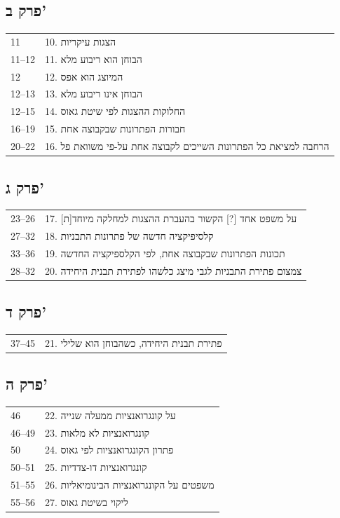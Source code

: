 \subsection*{פרק ב'}
\begin{tabular}{ll}
11 & 10. הצגות עיקריות \\
11--12 & 11. הבוחן הוא ריבוע מלא \\
12 & 12. המיוצג הוא אפס \\
12--13 & 13. הבוחן אינו ריבוע מלא \\
12--15 & 14. החלוקות ההצגות לפי שיטת גאוס \\
16--19 & 15. חבורות הפתרונות שבקבוצה אחת \\
20--22 & 16. הרחבה למציאת כל הפתרונות השייכים לקבוצה אחת על-פי משוואת פל \\
\end{tabular}

\subsection*{פרק ג'}
\begin{tabular}{ll}
23--26 & 17. על משפט אחד [?] הקשור בהעברת ההצגות למחלקה מיוחד[ת] \\
27--32 & 18. קלסיפיקציה חדשה של פתרונות התבניות \\
33--36 & 19. תכונות הפתרונות שבקבוצה אחת, לפי הקלספיקציה החדשה \\
28--32 & 20. צמצום פתירת התבניות לגבי מיצג כלשהו לפתירת תבנית היחידה \\
\end{tabular}

\subsection*{פרק ד'}
\begin{tabular}{ll}
37--45 & 21. פתירת תבנית היחידה, כשהבוחן הוא שלילי \\
\end{tabular}

\subsection*{פרק ה'}
\begin{tabular}{ll}
46 & 22. על קונגרואנציות ממעלה שנייה \\
46--49 & 23. קונגרואנציות לא מלאות \\
50 & 24. פתרון הקונגרואנציות לפי גאוס \\
50--51 & 25. קונגרואנציות דו-צדדיות \\
51--55 & 26. משפטים על הקונגרואנציות הבינומיאליות \\
55--56 & 27. ליקוי בשיטת גאוס \\
\end{tabular}


